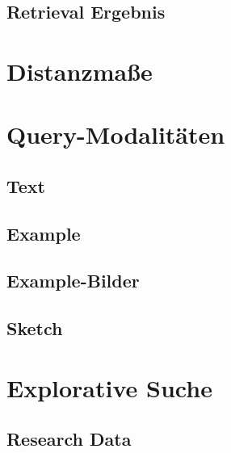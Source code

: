 \documentclass[a4paper, 11pt, accentcolor = tud3b]{tudreport}
\begin{document}
			\subsection{Retrieval Ergebnis} %

		\section{Distanzmaße} %

		\section{Query-Modalitäten} %

			\subsection{Text} %

			\subsection{Example} %

			\subsection{Example-Bilder} %

			\subsection{Sketch} %

		\section{Explorative Suche} %

			\subsection{Research Data} %
\end{document}
